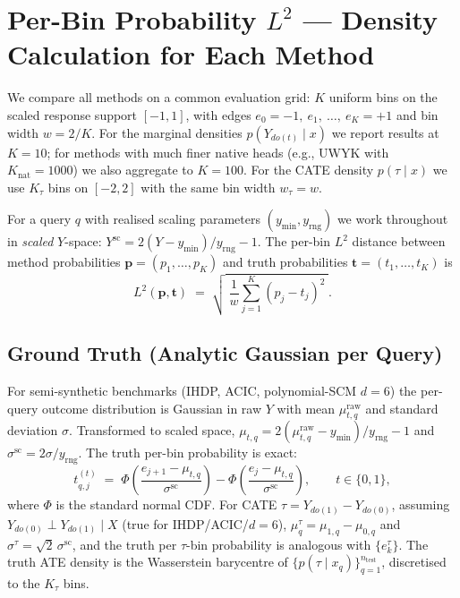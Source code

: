
\section{Per-Bin Probability \texorpdfstring{$L^2$}{L2} — Density Calculation for Each Method}
\label{app:density-l2}

We compare all methods on a common evaluation grid: $K$ uniform bins on
the scaled response support $[-1, 1]$, with edges
\(
e_0 = -1,\ e_1,\ \ldots,\ e_K = +1
\)
and bin width $w = 2/K$.  For the marginal densities $p(Y_{do(t)}\mid x)$
we report results at $K = 10$; for methods with much finer native heads
(e.g., UWYK with $K_{\text{nat}} = 1000$) we also aggregate to $K = 100$.
For the CATE density $p(\tau\mid x)$ we use $K_\tau$ bins on
$[-2, 2]$ with the same bin width $w_\tau = w$.

For a query $q$ with realised scaling parameters $(y_{\min}, y_{\mathrm{rng}})$
we work throughout in \emph{scaled} $Y$-space: $Y^{\text{sc}} = 2(Y-y_{\min})/y_{\mathrm{rng}} - 1$.
The per-bin $L^2$ distance between method probabilities
$\mathbf{p} = (p_1, \ldots, p_K)$ and truth probabilities
$\mathbf{t} = (t_1, \ldots, t_K)$ is
\begin{equation}
\label{eq:l2-def}
L^2(\mathbf{p}, \mathbf{t}) \;=\; \sqrt{\;\frac{1}{w}\sum_{j=1}^{K} (p_j - t_j)^2\;}.
\end{equation}

\subsection{Ground Truth (Analytic Gaussian per Query)}
For semi-synthetic benchmarks (IHDP, ACIC, polynomial-SCM $d{=}6$) the
per-query outcome distribution is Gaussian in raw $Y$ with mean
$\mu^{\text{raw}}_{t,q}$ and standard deviation $\sigma$.  Transformed to
scaled space, $\mu_{t,q} = 2(\mu^{\text{raw}}_{t,q} - y_{\min})/y_{\mathrm{rng}} - 1$
and $\sigma^{\text{sc}} = 2\sigma / y_{\mathrm{rng}}$.  The truth per-bin
probability is exact:
\begin{equation}
\label{eq:truth-marg}
t^{(t)}_{q,j} \;=\; \Phi\!\left(\frac{e_{j+1} - \mu_{t,q}}{\sigma^{\text{sc}}}\right)
                    - \Phi\!\left(\frac{e_{j} - \mu_{t,q}}{\sigma^{\text{sc}}}\right),
\qquad t \in \{0, 1\},
\end{equation}
where $\Phi$ is the standard normal CDF.  For CATE
$\tau = Y_{do(1)} - Y_{do(0)}$, assuming $Y_{do(0)} \perp Y_{do(1)} \mid X$
(true for IHDP/ACIC/$d{=}6$),
$\mu^\tau_q = \mu_{1,q} - \mu_{0,q}$ and $\sigma^\tau = \sqrt{2}\,\sigma^{\text{sc}}$,
and the truth per $\tau$-bin probability is analogous with
$\{e^\tau_k\}$.  The truth ATE density is the Wasserstein barycentre
of $\{p(\tau\mid x_q)\}_{q=1}^{n_{\text{test}}}$, discretised to the
$K_\tau$ bins.

